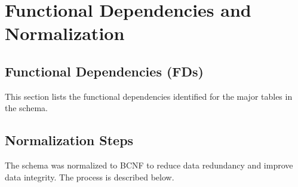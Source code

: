 \section{Functional Dependencies and Normalization}

\subsection{Functional Dependencies (FDs)}
This section lists the functional dependencies identified for the major tables in the schema.



\subsection{Normalization Steps}
The schema was normalized to BCNF to reduce data redundancy and improve data integrity. The process is described below.


